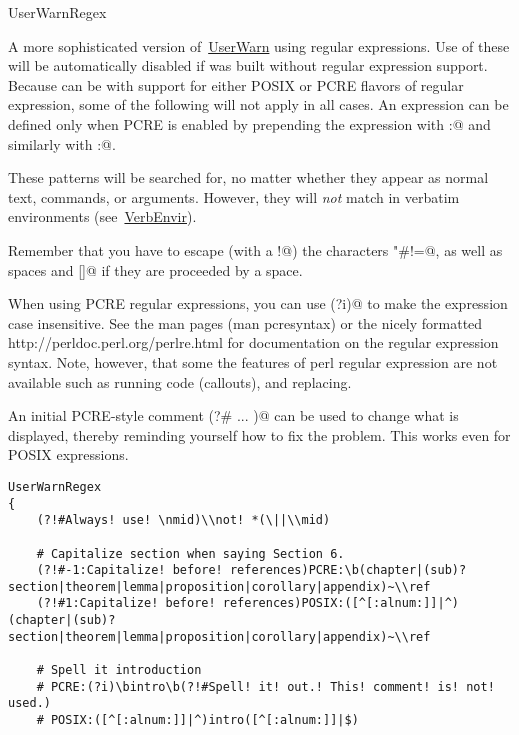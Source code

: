 \begin{chktexrclistvar}{UserWarnRegex}

A more sophisticated version of~\hyperref[rc:UserWarn]{UserWarn} using regular
expressions.  Use of these will be automatically disabled if \chktex{}
was built without regular expression support.  Because \chktex{} can be
with support for either POSIX or PCRE flavors of regular expression,
some of the following will not apply in all cases.  An expression
can be defined only when PCRE is enabled by prepending the
expression with \verb@PCRE:@ and similarly with \verb@POSIX:@.

These patterns will be searched for, no matter whether they appear
as normal text, commands, or arguments.  However, they will \emph{not}
match in verbatim environments (see~\hyperref[rc:VerbEnvir]{VerbEnvir}).

Remember that you have to escape (with a \verb@!@) the characters
\verb@"#!=@, as well as spaces and \verb@{}[]@ if they are
proceeded by a space.

When using PCRE regular expressions, you can use \verb@(?i)@ to make
the expression case insensitive.  See the man pages (man pcresyntax)
or the nicely formatted http://perldoc.perl.org/perlre.html for
documentation on the regular expression syntax.  Note, however, that
some the features of perl regular expression are not available such
as running code (callouts), and replacing.

An initial PCRE-style comment \verb@(?# ... )@ can be used
to change what is displayed, thereby reminding yourself how to fix
the problem.  This works even for POSIX expressions.

\chktexrcdefault\begin{verbatim}
UserWarnRegex
{
    (?!#Always! use! \nmid)\\not! *(\||\\mid)

    # Capitalize section when saying Section 6.
    (?!#-1:Capitalize! before! references)PCRE:\b(chapter|(sub)?section|theorem|lemma|proposition|corollary|appendix)~\\ref
    (?!#1:Capitalize! before! references)POSIX:([^[:alnum:]]|^)(chapter|(sub)?section|theorem|lemma|proposition|corollary|appendix)~\\ref

    # Spell it introduction
    # PCRE:(?i)\bintro\b(?!#Spell! it! out.! This! comment! is! not! used.)
    # POSIX:([^[:alnum:]]|^)intro([^[:alnum:]]|$)


\end{verbatim}
\end{chktexrclistvar}
